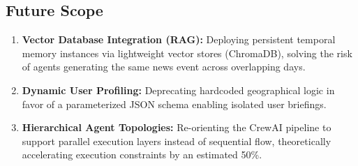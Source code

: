 \documentclass[conference]{IEEEtran}
\begin{document}
\subsection{Future Scope}
\begin{enumerate}
    \item \textbf{Vector Database Integration (RAG):} Deploying persistent temporal memory instances via lightweight vector stores (ChromaDB), solving the risk of agents generating the same news event across overlapping days.
    \item \textbf{Dynamic User Profiling:} Deprecating hardcoded geographical logic in favor of a parameterized JSON schema enabling isolated user briefings.
    \item \textbf{Hierarchical Agent Topologies:} Re-orienting the CrewAI pipeline to support parallel execution layers instead of sequential flow, theoretically accelerating execution constraints by an estimated 50\%.
\end{enumerate}
\end{document}

